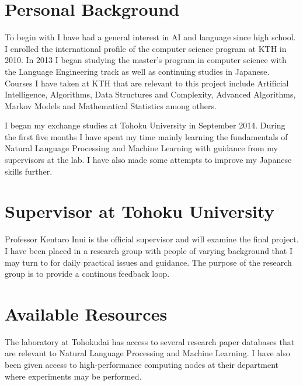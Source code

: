 \documentclass{article}
\begin{document}
\section{Personal Background}
To begin with I have had a general interest in AI and language since high school. I enrolled the international profile of the computer science program at KTH in 2010. In 2013 I began studying the master's program in computer science with the Language Engineering track as well as continuing studies in Japanese. Courses I have taken at KTH that are relevant to this project include Artificial Intelligence, Algorithms, Data Structures and Complexity, Advanced Algorithms, Markov Models and Mathematical Statistics among others. 

I began my exchange studies at Tohoku University in September 2014. During the first five months I have spent my time mainly learning the fundamentals of Natural Language Processing and Machine Learning with guidance from my supervisors at the lab. I have also made some attempts to improve my Japanese skills further.
\section{Supervisor at Tohoku University}
Professor Kentaro Inui is the official supervisor and will examine the final project. I have been placed in a research group with people of varying background that I may turn to for daily practical issues and guidance. The purpose of the research group is to provide a continous feedback loop.

\section{Available Resources}
The laboratory at Tohokudai has access to several research paper databases that are relevant to Natural Language Processing and Machine Learning. I have also been given access to high-performance computing nodes at their department where experiments may be performed.
\end{document}
